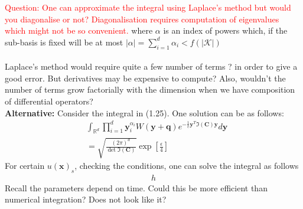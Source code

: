 \textcolor{red}{Question:
One can approximate the integral using Laplace's method but 
would you diagonalise or not? Diagonalisation requires computation of 
eigenvalues which might not be so convenient.}
where $\alpha$ is an index of powers which, if the sub-basis is fixed 
will be at most $|\alpha| = \sum_{i=1}^d \alpha_i < f(|\mathcal{K}|)$ 
\\
\\
Laplace's method would require quite a few number of terms ? in order 
to give a good error. But derivatives may be expensive to compute? Also, 
wouldn't the number of terms grow factorially with the dimension 
when we have composition of differential operators?
\\
\textbf{Alternative:}
Consider the integral in (1.25). One solution can be as follows: 
\begin{equation}
  \begin{split}
  &\int_{\mathbb{R}^d}\prod_{i = 1}^d \bm{y}^{\alpha_i}_{i} 
  W(\bm{y + q}) 
  e^{-\frac{1}{\epsilon}\bm{y}^T\Im(\bm{C})\bm{y}}
  d \bm{y}
  \\
  &=
  \sqrt{\frac{(2\pi)^d}{\det \Im(\bm{C})}}
  \exp{\left[\frac{\epsilon}{4}\right]}
  \end{split}
\end{equation}
For certain $u(\bm{x})_{s}$, checking the conditions, one can solve the integral 
as follows
\begin{equation}
  \begin{split}
   h 
  \end{split}
\end{equation}
Recall the parameters depend on time. Could this be more efficient than 
numerical integration? Does not look like it?


